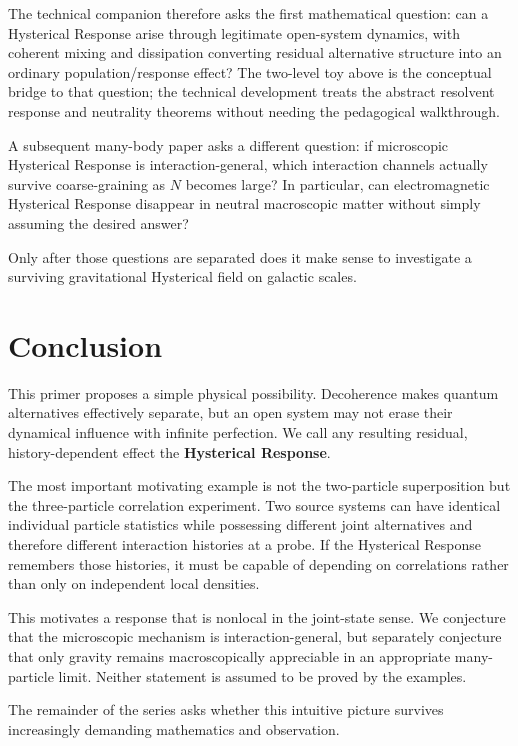 \documentclass[11pt]{article}
\begin{document}
The technical companion therefore asks the first mathematical question: can a Hysterical Response arise through legitimate open-system dynamics, with coherent mixing and dissipation converting residual alternative structure into an ordinary population/response effect? The two-level toy above is the conceptual bridge to that question; the technical development treats the abstract resolvent response and neutrality theorems without needing the pedagogical walkthrough.

A subsequent many-body paper asks a different question: if microscopic Hysterical Response is interaction-general, which interaction channels actually survive coarse-graining as $N$ becomes large? In particular, can electromagnetic Hysterical Response disappear in neutral macroscopic matter without simply assuming the desired answer?

Only after those questions are separated does it make sense to investigate a surviving gravitational Hysterical field on galactic scales.

\section{Conclusion}
This primer proposes a simple physical possibility. Decoherence makes quantum alternatives effectively separate, but an open system may not erase their dynamical influence with infinite perfection. We call any resulting residual, history-dependent effect the \textbf{Hysterical Response}.

The most important motivating example is not the two-particle superposition but the three-particle correlation experiment. Two source systems can have identical individual particle statistics while possessing different joint alternatives and therefore different interaction histories at a probe. If the Hysterical Response remembers those histories, it must be capable of depending on correlations rather than only on independent local densities.

This motivates a response that is nonlocal in the joint-state sense. We conjecture that the microscopic mechanism is interaction-general, but separately conjecture that only gravity remains macroscopically appreciable in an appropriate many-particle limit. Neither statement is assumed to be proved by the examples.

The remainder of the series asks whether this intuitive picture survives increasingly demanding mathematics and observation.
\end{document}
